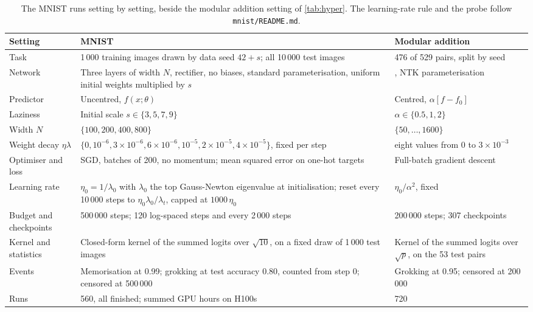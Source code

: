 \documentclass[a4paper,11pt]{article} %
\newcommand{\file}[1]{\nolinkurl{#1}}
\begin{document}
\begin{table}[htbp]
  \centering\footnotesize
  \caption{The MNIST runs setting by setting, beside the modular addition
    setting of \cref{tab:hyper}. The learning-rate rule and the probe follow
  \file{mnist/README.md}.}
  \label{tab:mnist-settings}
  \begin{tabular}{L{2.6cm}L{6.1cm}L{4.3cm}}
    \toprule
    Setting & MNIST & Modular addition \\
    \midrule
    Task & 1\,000 training images drawn by data seed $42+s$; all
    10\,000 test images & 476 of 529 pairs, split by seed \\
    Network & Three layers of width $N$, rectifier, no biases,
    standard parameterisation, uniform initial weights multiplied by
    $s$ & , NTK parameterisation \\
    Predictor & Uncentred, $f(x;\theta)$ & Centred, $\alpha[f-f_0]$ \\
    Laziness & Initial scale $s\in\{3,5,7,9\}$ & $\alpha\in\{0.5,1,2\}$ \\
    Width $N$ & $\{100,200,400,800\}$ & $\{50,\dots,1600\}$ \\
    Weight decay $\eta\lambda$ &
    $\{0,10^{-6},3\times10^{-6},6\times10^{-6},10^{-5},2\times10^{-5},4\times10^{-5}\}$,
    fixed per step & eight values from 0 to $3\times10^{-3}$ \\
    Optimiser and loss & SGD, batches of 200, no momentum; mean
    squared error on one-hot targets & Full-batch gradient descent \\
    Learning rate & $\eta_0=1/\lambda_0$ with $\lambda_0$ the top
    Gauss-Newton eigenvalue at initialisation; reset every 10\,000
    steps to $\eta_0\lambda_0/\lambda_t$, capped at $1000\,\eta_0$ &
    $\eta_0/\alpha^2$, fixed \\
    Budget and checkpoints & 500\,000 steps; 120 log-spaced steps and
    every 2\,000 steps & 200\,000 steps; 307 checkpoints \\
    Kernel and statistics & Closed-form kernel of the summed logits
    over $\sqrt{10}$, on a fixed draw of 1\,000 test images & Kernel
    of the summed logits over $\sqrt p$, on the 53 test pairs \\
    Events & Memorisation at 0.99; grokking at test accuracy 0.80,
    counted from step 0; censored at 500\,000 & Grokking at 0.95;
    censored at 200\,000 \\
    Runs & 560, all finished; \EnineteenHours{} summed GPU hours on
    H100s & 720 \\
    \bottomrule
  \end{tabular}
\end{table}
\end{document}

